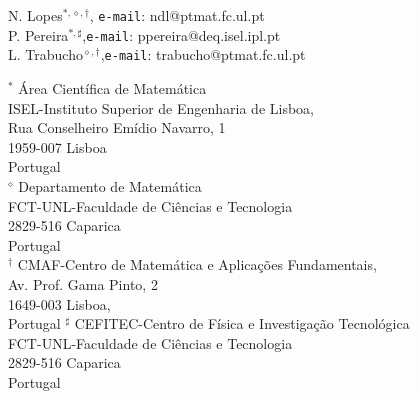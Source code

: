 \begin{center}
N. Lopes\(^{\ast,\diamond,\dagger}\), {\tt e-mail}: ndl@ptmat.fc.ul.pt\\
\quad P. Pereira\(^{\ast,\sharp}\),{\tt e-mail}: ppereira@deq.isel.ipl.pt\\
L. Trabucho\(^{\diamond,\dagger}\),{\tt e-mail}: trabucho@ptmat.fc.ul.pt   
\end{center}
\vskip0.2in
{
\noindent \(^{\ast}\) \'{A}rea Cient\'{i}fica de Matem\'{a}tica\\
ISEL-Instituto Superior de Engenharia de Lisboa,
\\
Rua Conselheiro Em\'{i}dio Navarro, 1\\
1959-007 Lisboa\\
Portugal\\
}
\vskip0.2in
{
\noindent \(^{\diamond}\)
Departamento de Matem\'{a}tica\\
FCT-UNL-Faculdade de Ci\^{e}ncias e Tecnologia\\
2829-516 Caparica\\
Portugal\\
}
\vskip0.2in
{
\noindent \(^{\dagger}\)
CMAF-Centro de Matem\'{a}tica e Aplica\c{c}\~{o}es
Fundamentais,\\
Av. Prof. Gama Pinto, 2\\
1649-003 Lisboa,\\
Portugal
}
\vskip0.2in
{
\noindent \(^{\sharp}\)
CEFITEC-Centro de F\'{i}sica e Investiga\c{c}\~ao Tecnol\'{o}gica\\
FCT-UNL-Faculdade de Ci\^{e}ncias e Tecnologia\\
2829-516 Caparica\\
Portugal\\
}
\vfill

